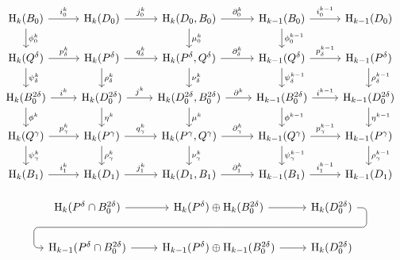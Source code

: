 
\begin{equation}\begin{tikzcd}
    \hom_k(B_0)\arrow{r}{i^k_0}\arrow{d}{\phi^k_0} &
    \hom_k(D_0)\arrow{r}{j^k_0} & %
    \hom_k(D_0, B_0)\arrow{r}{\partial^k_0}\arrow{d}{\mu^k_0} &
    \hom_{k-1}(B_0)\arrow{r}{i^{k-1}_0}\arrow{d}{\phi^{k-1}_0} &
    \hom_{k-1}(D_0) \\%
    \hom_k(Q^\delta)\arrow{r}{p^k_\delta} \arrow{d}{\psi^k_\delta} &
    \hom_k(P^\delta)\arrow{r}{q^k_\delta} \arrow{d}{\rho^k_\delta} &
    \hom_k(P^\delta, Q^\delta)\arrow{r}{\partial^k_\delta} \arrow{d}{\nu^k_\delta} &
    \hom_{k-1}(Q^\delta)\arrow{r}{p^{k-1}_\delta} \arrow{d}{\psi^{k-1}_\delta} &
    \hom_{k-1}(P^\delta)\arrow{d}{\rho^{k-1}_\delta}\\
    \hom_k(B_0^{2\delta})\arrow{r}{i^k}\arrow{d}{\phi^k} &
    \hom_k(D_0^{2\delta})\arrow{r}{j^k}\arrow{d}{\eta^k} &
    \hom_k(D_0^{2\delta}, B_0^{2\delta})\arrow{r}{\partial^k}\arrow{d}{\mu^k} &
    \hom_{k-1}(B_0^{2\delta})\arrow{r}{i^{k-1}}\arrow{d}{\phi^{k-1}} &
    \hom_{k-1}(D_0^{2\delta})\arrow{d}{\eta^{k-1}}\\
    \hom_k(Q^\gamma)\arrow{r}{p^k_\gamma} \arrow{d}{\psi^k_\gamma} &
    \hom_k(P^\gamma)\arrow{r}{q^k_\gamma} \arrow{d}{\rho^k_\gamma} &
    \hom_k(P^\gamma, Q^\gamma)\arrow{r}{\partial^k_\gamma} \arrow{d}{\nu^k_\gamma} &
    \hom_{k-1}(Q^\gamma)\arrow{r}{p^{k-1}_\gamma} \arrow{d}{\psi^{k-1}_\gamma} &
    \hom_{k-1}(P^\gamma)\arrow{d}{\rho^{k-1}_\gamma}\\
    \hom_k(B_1)\arrow{r}{i^k_1} &
    \hom_k(D_1)\arrow{r}{j^k_1} &
    \hom_k(D_1, B_1)\arrow{r}{\partial^k_1} &
    \hom_{k-1}(B_1)\arrow{r}{i^{k-1}_1} &
    \hom_{k-1}(D_1)
\end{tikzcd}\end{equation}

\begin{equation}\begin{tikzcd}
    \hom_k(P^\delta \cap B_0^{2\delta})\arrow[r] &
    \hom_k(P^\delta)\oplus\hom_k(B_0^{2\delta})\arrow[r]
        \arrow[d, phantom, ""{coordinate, name=Z}] &
    \hom_k(D_0^{2\delta})\arrow[dll, "", rounded corners,
              to path={ -- ([xshift=2ex]\tikztostart.east)
                        |- (Z) [near end]\tikztonodes
                        -| ([xshift=-2ex]\tikztotarget.west)
                        -- (\tikztotarget)}] \\
    \hom_{k-1}(P^\delta \cap B_0^{2\delta})\arrow[r] &
    \hom_{k-1}(P^\delta)\oplus\hom_{k-1}(B_0^{2\delta})\arrow[r] &
    \hom_k(D_0^{2\delta})
\end{tikzcd}\end{equation}

